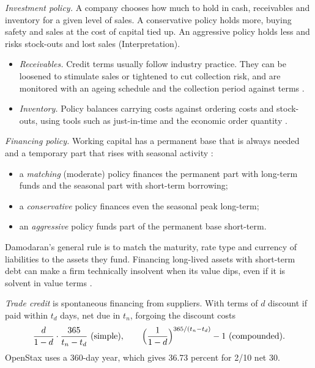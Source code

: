 \begin{qfmethod}\label{meth:working-capital-policy}
 \emph{Investment policy.} A company chooses how much to hold in cash, receivables and inventory for a given level of sales. A conservative policy holds more, buying safety and sales at the cost of capital tied up. An aggressive policy holds less and risks stock-outs and lost sales (Interpretation).
\begin{itemize}
\item \emph{Receivables.} Credit terms usually follow industry practice. They can be loosened to stimulate sales or tightened to cut collection risk, and are monitored with an ageing schedule and the collection period against terms \citep[sec.~19.4]{principles-of-finance-2026}.
\item \emph{Inventory.} Policy balances carrying costs against ordering costs and stock-outs, using tools such as just-in-time and the economic order quantity \citep[sec.~19.5]{principles-of-finance-2026}.
\end{itemize}

\emph{Financing policy.} Working capital has a permanent base that is always needed and a temporary part that rises with seasonal activity \citep[sec.~19.1]{principles-of-finance-2026}:
\begin{itemize}
\item a \emph{matching} (moderate) policy finances the permanent part with long-term funds and the seasonal part with short-term borrowing;
\item a \emph{conservative} policy finances even the seasonal peak long-term;
\item an \emph{aggressive} policy funds part of the permanent base short-term.
\end{itemize}
Damodaran's general rule is to match the maturity, rate type and currency of liabilities to the assets they fund. Financing long-lived assets with short-term debt can make a firm technically insolvent when its value dips, even if it is solvent in value terms \citep[pp.~411--413]{applied-corporate-finance-2014}.

\emph{Trade credit} is spontaneous financing from suppliers. With terms of $d$ discount if paid within $t_d$ days, net due in $t_n$, forgoing the discount costs \citep[sec.~19.2]{principles-of-finance-2026}
\[ \frac{d}{1-d}\cdot\frac{365}{t_n-t_d}\ \text{(simple)},\qquad \Bigl(\frac{1}{1-d}\Bigr)^{365/(t_n-t_d)}-1\ \text{(compounded)}. \]
OpenStax uses a 360-day year, which gives 36.73 percent for 2/10 net 30.


\end{qfmethod}
